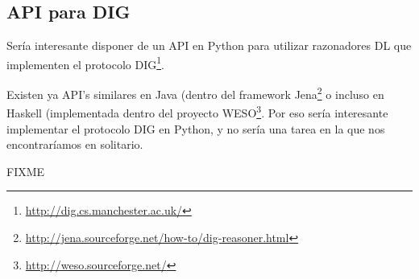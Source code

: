 \subsection*{API para DIG}

Sería interesante disponer de un API en Python para utilizar razonadores DL que implementen 
el protocolo DIG\footnote{\url{http://dig.cs.manchester.ac.uk/}}. 

Existen ya API's similares en Java (dentro del framework
Jena\footnote{\url{http://jena.sourceforge.net/how-to/dig-reasoner.html}} o incluso en Haskell 
(implementada dentro del proyecto WESO\footnote{\url{http://weso.sourceforge.net/}}. Por eso 
sería interesante implementar el protocolo DIG en Python, y no sería una tarea
en la que nos encontraríamos en solitario\cite{PythonOWL}.

FIXME
